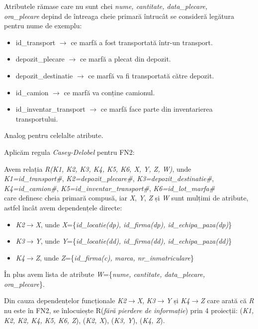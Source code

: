 \documentclass[12pt, a4paper]{article}
\begin{document}
Atributele rămase care nu sunt chei \emph{nume, cantitate, data\_plecare, \\ora\_plecare} depind de întreaga cheie primară întrucât se consideră legătura pentru nume de exemplu:
\begin{itemize}
    \item id\_transport $\rightarrow$ ce marfă a fost transportată într-un transport.
    \item depozit\_plecare $\rightarrow$ ce marfă a plecat din depozit.
    \item depozit\_destinatie $\rightarrow$ ce marfă va fi transportată către depozit.
    \item id\_camion $\rightarrow$ ce marfă va conține camionul.
    \item id\_inventar\_transport $\rightarrow$ ce marfă face parte din inventarierea transportului.
\end{itemize}

Analog pentru celelalte atribute.

Aplicăm regula \emph{Casey-Delobel} pentru FN2:

Avem relația \emph{R(K1, K2, K3, K4, K5, K6, X, Y, Z, W)}, unde \\
\emph{K1=id\_transport\#}, \emph{K2=depozit\_plecare\#}, \emph{K3=depozit\_destinatie\#}, \\\emph{K4=id\_camion\#}, \emph{K5=id\_inventar\_transport\#}, \emph{K6=id\_lot\_marfa\#} \\care definesc cheia primară compusă, iar \emph{X}, \emph{Y}, \emph{Z} și \emph{W} sunt mulțimi de atribute, astfel încât avem dependențele directe: 
\begin{itemize}
    \item \emph{K2}$\rightarrow$\emph{X}, unde \emph{X}=\{\emph{id\_locatie(dp), id\_firma(dp), id\_echipa\_paza(dp)}\}
    \item \emph{K3}$\rightarrow$\emph{Y}, unde \emph{Y}=\{\emph{id\_locatie(dd), id\_firma(dd), id\_echipa\_paza(dd)}\}
    \item \emph{K4}$\rightarrow$\emph{Z}, unde \emph{Z}=\{\emph{id\_firma(c), marca, nr\_inmatriculare}\}
\end{itemize}

În plus avem lista de atribute \emph{W}=\{\emph{nume, cantitate, data\_plecare, \\ora\_plecare}\}.

Din cauza dependențelor funcționale \emph{K2}$\rightarrow$\emph{X}, \emph{K3}$\rightarrow$\emph{Y} și \emph{K4}$\rightarrow$\emph{Z} care arată că \emph{R} nu este în FN2, se înlocuiește R(\emph{fără pierdere de informație}) prin 4 proiecții:
(\emph{K1, K2, K2, K4, K5, K6, Z}), (\emph{K2, X}), (\emph{K3, Y}), (\emph{K4, Z}).
\end{document}
